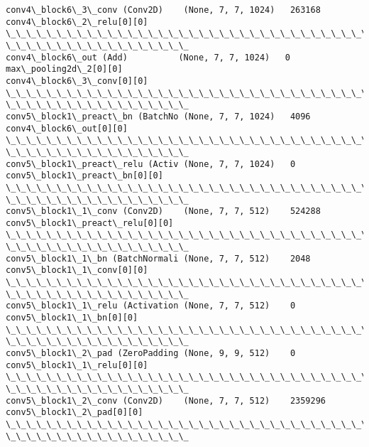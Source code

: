 \documentclass[11pt]{article}
\begin{document}
\begin{Verbatim}[commandchars=\\\{\}]
conv4\_block6\_3\_conv (Conv2D)    (None, 7, 7, 1024)   263168
conv4\_block6\_2\_relu[0][0]
\_\_\_\_\_\_\_\_\_\_\_\_\_\_\_\_\_\_\_\_\_\_\_\_\_\_\_\_\_\_\_\_\_\_\_\_\_\_\_\_\_\_\_\_\_\_\_\_\_\_\_\_\_\_\_\_\_\_\_\_\_\_\_\_\_\_\_\_\_\_\_\_\_\_\_\_\_\_\_\_
\_\_\_\_\_\_\_\_\_\_\_\_\_\_\_\_\_\_
conv4\_block6\_out (Add)          (None, 7, 7, 1024)   0
max\_pooling2d\_2[0][0]
conv4\_block6\_3\_conv[0][0]
\_\_\_\_\_\_\_\_\_\_\_\_\_\_\_\_\_\_\_\_\_\_\_\_\_\_\_\_\_\_\_\_\_\_\_\_\_\_\_\_\_\_\_\_\_\_\_\_\_\_\_\_\_\_\_\_\_\_\_\_\_\_\_\_\_\_\_\_\_\_\_\_\_\_\_\_\_\_\_\_
\_\_\_\_\_\_\_\_\_\_\_\_\_\_\_\_\_\_
conv5\_block1\_preact\_bn (BatchNo (None, 7, 7, 1024)   4096
conv4\_block6\_out[0][0]
\_\_\_\_\_\_\_\_\_\_\_\_\_\_\_\_\_\_\_\_\_\_\_\_\_\_\_\_\_\_\_\_\_\_\_\_\_\_\_\_\_\_\_\_\_\_\_\_\_\_\_\_\_\_\_\_\_\_\_\_\_\_\_\_\_\_\_\_\_\_\_\_\_\_\_\_\_\_\_\_
\_\_\_\_\_\_\_\_\_\_\_\_\_\_\_\_\_\_
conv5\_block1\_preact\_relu (Activ (None, 7, 7, 1024)   0
conv5\_block1\_preact\_bn[0][0]
\_\_\_\_\_\_\_\_\_\_\_\_\_\_\_\_\_\_\_\_\_\_\_\_\_\_\_\_\_\_\_\_\_\_\_\_\_\_\_\_\_\_\_\_\_\_\_\_\_\_\_\_\_\_\_\_\_\_\_\_\_\_\_\_\_\_\_\_\_\_\_\_\_\_\_\_\_\_\_\_
\_\_\_\_\_\_\_\_\_\_\_\_\_\_\_\_\_\_
conv5\_block1\_1\_conv (Conv2D)    (None, 7, 7, 512)    524288
conv5\_block1\_preact\_relu[0][0]
\_\_\_\_\_\_\_\_\_\_\_\_\_\_\_\_\_\_\_\_\_\_\_\_\_\_\_\_\_\_\_\_\_\_\_\_\_\_\_\_\_\_\_\_\_\_\_\_\_\_\_\_\_\_\_\_\_\_\_\_\_\_\_\_\_\_\_\_\_\_\_\_\_\_\_\_\_\_\_\_
\_\_\_\_\_\_\_\_\_\_\_\_\_\_\_\_\_\_
conv5\_block1\_1\_bn (BatchNormali (None, 7, 7, 512)    2048
conv5\_block1\_1\_conv[0][0]
\_\_\_\_\_\_\_\_\_\_\_\_\_\_\_\_\_\_\_\_\_\_\_\_\_\_\_\_\_\_\_\_\_\_\_\_\_\_\_\_\_\_\_\_\_\_\_\_\_\_\_\_\_\_\_\_\_\_\_\_\_\_\_\_\_\_\_\_\_\_\_\_\_\_\_\_\_\_\_\_
\_\_\_\_\_\_\_\_\_\_\_\_\_\_\_\_\_\_
conv5\_block1\_1\_relu (Activation (None, 7, 7, 512)    0
conv5\_block1\_1\_bn[0][0]
\_\_\_\_\_\_\_\_\_\_\_\_\_\_\_\_\_\_\_\_\_\_\_\_\_\_\_\_\_\_\_\_\_\_\_\_\_\_\_\_\_\_\_\_\_\_\_\_\_\_\_\_\_\_\_\_\_\_\_\_\_\_\_\_\_\_\_\_\_\_\_\_\_\_\_\_\_\_\_\_
\_\_\_\_\_\_\_\_\_\_\_\_\_\_\_\_\_\_
conv5\_block1\_2\_pad (ZeroPadding (None, 9, 9, 512)    0
conv5\_block1\_1\_relu[0][0]
\_\_\_\_\_\_\_\_\_\_\_\_\_\_\_\_\_\_\_\_\_\_\_\_\_\_\_\_\_\_\_\_\_\_\_\_\_\_\_\_\_\_\_\_\_\_\_\_\_\_\_\_\_\_\_\_\_\_\_\_\_\_\_\_\_\_\_\_\_\_\_\_\_\_\_\_\_\_\_\_
\_\_\_\_\_\_\_\_\_\_\_\_\_\_\_\_\_\_
conv5\_block1\_2\_conv (Conv2D)    (None, 7, 7, 512)    2359296
conv5\_block1\_2\_pad[0][0]
\_\_\_\_\_\_\_\_\_\_\_\_\_\_\_\_\_\_\_\_\_\_\_\_\_\_\_\_\_\_\_\_\_\_\_\_\_\_\_\_\_\_\_\_\_\_\_\_\_\_\_\_\_\_\_\_\_\_\_\_\_\_\_\_\_\_\_\_\_\_\_\_\_\_\_\_\_\_\_\_
\_\_\_\_\_\_\_\_\_\_\_\_\_\_\_\_\_\_

\end{Verbatim}
\end{document}
